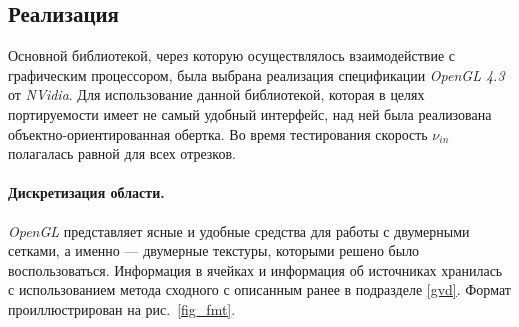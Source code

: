 \documentclass[12pt]{article}
\begin{document}
\subsection{Реализация}
Основной библиотекой, через которую осуществлялось взаимодействие с графическим
процессором, была выбрана реализация спецификации \emph{OpenGL 4.3} от 
\emph{NVidia\textregistered}. Для использование данной библиотекой, 
которая в целях портируемости имеет не самый удобный интерфейс,
над ней была реализована объектно-ориентированная обертка. 
Во время тестирования скорость $\nu_{in}$ полагалась равной для всех отрезков.

\paragraph{Дискретизация области.} \emph{OpenGL} представляет ясные и 
удобные средства для работы с двумерными сетками, а именно --- двумерные
текстуры, которыми решено было воспользоваться. Информация в ячейках и информация
об источниках хранилась с использованием метода сходного с описанным ранее 
в подразделе \ref{gvd}. Формат проиллюстрирован на рис.~\ref{fig_fmt}.
\end{document}
